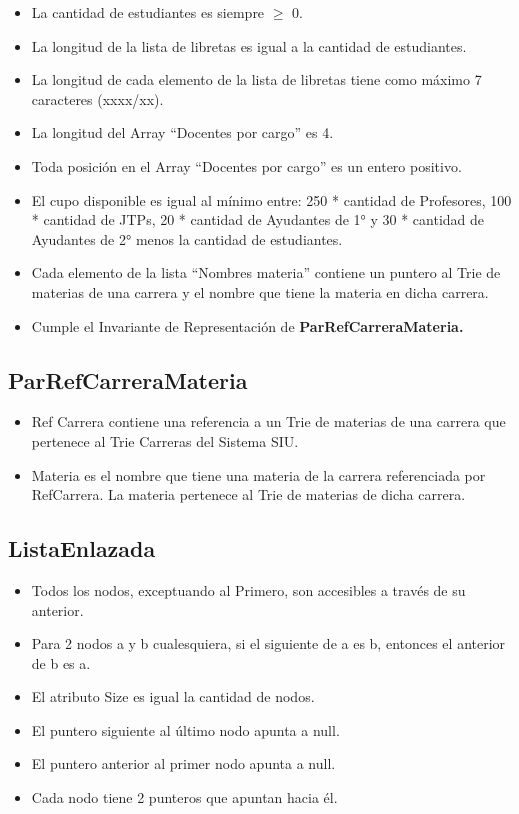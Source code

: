 \documentclass[10pt,a4paper]{article}
\begin{document}
\begin{itemize}
	\item La cantidad de estudiantes es siempre $\geq$ 0.
	\item La longitud de la lista de libretas es igual a la cantidad de estudiantes.
	\item La longitud de cada elemento de la lista de libretas tiene como máximo 7 caracteres (xxxx/xx).
	\item La longitud del Array “Docentes por cargo” es 4.
	\item Toda posición en el Array “Docentes por cargo” es un entero positivo.
	\item El cupo disponible es igual al mínimo entre:
	      250 * cantidad de Profesores, 100 * cantidad de JTPs, 20 * cantidad de Ayudantes de 1° y
	      30 * cantidad de Ayudantes de 2° menos la cantidad de estudiantes.
	\item Cada elemento de la lista “Nombres materia” contiene un puntero al Trie de materias
	      de una carrera y el nombre que tiene la materia en dicha carrera.
	\item Cumple el Invariante de Representación de \bfseries{ParRefCarreraMateria}.
\end{itemize}

\subsection{ParRefCarreraMateria}

\begin{itemize}
	\item Ref Carrera contiene una referencia a un Trie de materias de una carrera que pertenece
	      al Trie Carreras del Sistema SIU.
	\item Materia es el nombre que tiene una materia de la carrera referenciada por RefCarrera.
	      La materia pertenece al Trie de materias de dicha carrera.
\end{itemize}

\subsection{ListaEnlazada}

\begin{itemize}
	\item Todos los nodos, exceptuando al Primero, son accesibles a través de su anterior.
	\item Para 2 nodos a y b cualesquiera, si el siguiente de a es b, entonces
	      el anterior de b es a.
	\item El atributo Size es igual la cantidad de nodos.
	\item El puntero siguiente al último nodo apunta a null.
	\item El puntero anterior al primer nodo apunta a null.
	\item Cada nodo tiene 2 punteros que apuntan hacia él.
\end{itemize}
\end{document}
